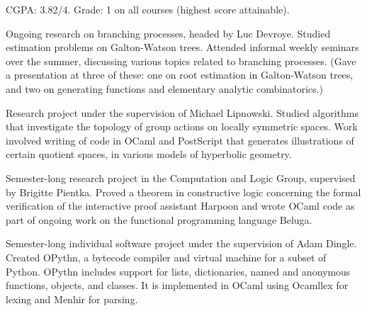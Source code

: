
CGPA: 3.82/4.
\medbreak
{}
Grade: 1 on all courses (highest score attainable).


\smallskip
{}


\smallskip
Ongoing research on branching processes, headed by Luc Devroye. Studied estimation problems
on Galton-Watson trees. Attended informal weekly seminars over the summer, discussing
various topics related to branching
processes. (Gave a presentation at three of these: one on root estimation in Galton-Watson
trees, and two on generating functions and elementary analytic combinatorics.)

\medbreak
{}
\smallskip
Research project under the supervision of Michael Lipnowski.
Studied algorithms that investigate the topology of group actions on locally symmetric spaces.
Work involved writing of code in OCaml and PostScript that generates illustrations of certain quotient
spaces, in various models of hyperbolic geometry.
\medbreak

\smallskip
Semester-long research project in the Computation and Logic Group, supervised
by Brigitte Pientka.
Proved a theorem in constructive logic concerning the formal verification
of the interactive proof assistant Harpoon and wrote OCaml code as part of
ongoing work on the functional programming language Beluga.
\medbreak

\smallskip
Semester-long individual software project under the supervision of Adam Dingle.
Created OPythn, a bytecode compiler and virtual machine for a subset of Python.
OPythn includes support for lists, dictionaries, named and anonymous functions, objects, and classes.
It is implemented in OCaml using Ocamllex for lexing and Menhir for parsing.

